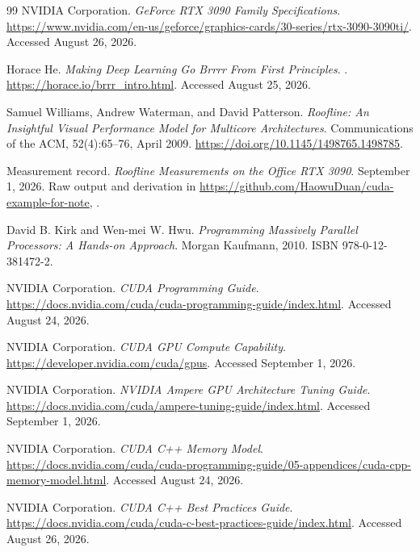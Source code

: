 \documentclass[11pt]{article}
\numberwithin{equation}{section}
\numberwithin{figure}{section}
\numberwithin{table}{section}
\begin{document}
\begin{thebibliography}{99}
NVIDIA Corporation.
\newblock \emph{GeForce RTX 3090 Family Specifications}.
\newblock \url{https://www.nvidia.com/en-us/geforce/graphics-cards/30-series/rtx-3090-3090ti/}.
\newblock Accessed August 26, 2026.

Horace He.
\newblock \emph{Making Deep Learning Go Brrrr From First Principles}.
.
\newblock \url{https://horace.io/brrr_intro.html}.
\newblock Accessed August 25, 2026.

Samuel Williams, Andrew Waterman, and David Patterson.
\newblock \emph{Roofline: An Insightful Visual Performance Model for Multicore
Architectures}.
\newblock Communications of the ACM, 52(4):65--76, April 2009.
\newblock \url{https://doi.org/10.1145/1498765.1498785}.

Measurement record.
\newblock \emph{Roofline Measurements on the Office RTX 3090}.
\newblock September 1, 2026.
\newblock Raw output and derivation in
\url{https://github.com/HaowuDuan/cuda-example-for-note},
.

David B. Kirk and Wen-mei W. Hwu.
\newblock \emph{Programming Massively Parallel Processors: A Hands-on Approach}.
\newblock Morgan Kaufmann, 2010.
\newblock ISBN 978-0-12-381472-2.

NVIDIA Corporation.
\newblock \emph{CUDA Programming Guide}.
\newblock \url{https://docs.nvidia.com/cuda/cuda-programming-guide/index.html}.
\newblock Accessed August 24, 2026.

NVIDIA Corporation.
\newblock \emph{CUDA GPU Compute Capability}.
\newblock \url{https://developer.nvidia.com/cuda/gpus}.
\newblock Accessed September 1, 2026.

NVIDIA Corporation.
\newblock \emph{NVIDIA Ampere GPU Architecture Tuning Guide}.
\newblock \url{https://docs.nvidia.com/cuda/ampere-tuning-guide/index.html}.
\newblock Accessed September 1, 2026.

NVIDIA Corporation.
\newblock \emph{CUDA C++ Memory Model}.
\newblock \url{https://docs.nvidia.com/cuda/cuda-programming-guide/05-appendices/cuda-cpp-memory-model.html}.
\newblock Accessed August 24, 2026.

NVIDIA Corporation.
\newblock \emph{CUDA C++ Best Practices Guide}.
\newblock \url{https://docs.nvidia.com/cuda/cuda-c-best-practices-guide/index.html}.
\newblock Accessed August 26, 2026.


\end{thebibliography}
\end{document}
